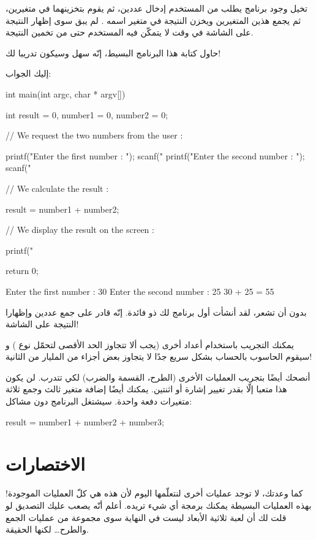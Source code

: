 تخيل وجود برنامج يطلب من المستخدم إدخال عددين، ثم يقوم بتخزينهما في متغيرين، ثم يجمع هذين المتغيرين ويخزن النتيجة في متغير اسمه
.
لم يبق سوى إظهار النتيجة على الشاشة في وقت لا يتمكّن فيه المستخدم حتى من تخمين النتيجة.

حاول كتابة هذا البرنامج البسيط، إنّه سهل وسيكون تدريبا لك!

إليك الجواب:

\begin{Csource}
int main(int argc, char * argv[])
{
  int result = 0, number1 = 0, number2 = 0;

  // We request the two numbers from the user :

  printf("Enter the first number : ");
  scanf("%
  printf("Enter the second number : ");
  scanf("%

  // We calculate the result :

  result = number1 + number2;

  // We display the result on the screen :

  printf("%

  return 0;
}
\end{Csource}

\begin{Console}
  Enter the first number : 30
  Enter the second number : 25
  30 + 25 = 55
\end{Console}

بدون أن تشعر، لقد أنشأت أول برنامج لك ذو فائدة. إنّه قادر على جمع عددين وإظهارا النتيجة على الشاشة!

يمكنك التجريب باستخدام أعداد أخرى (يجب ألا تتجاوز الحد الأقصى لتحمّل نوع )
و سيقوم الحاسوب بالحساب بشكل سريع جدًا لا يتجاوز بعض أجزاء من المليار من الثانية!

أنصحك أيضًا بتجريب العمليات الأخرى (الطرح، القسمة والضرب) لكي تتدرب. لن يكون هذا متعبا إلّا بقدر تغيير إشارة أو اثنتين. يمكنك أيضًا إضافة متغير ثالث وجمع ثلاثة متغيرات دفعة واحدة. سيشتغل البرنامج دون مشاكل:

\begin{Csource}
result = number1 + number2 + number3;
\end{Csource}

\section{الاختصارات}

كما وعدتك، لا توجد عمليات أخرى لنتعلّمها اليوم لأن هذه هي كلّ العمليات الموجودة! بهذه العمليات البسيطة يمكنك برمجة أي شيء تريده. أعلم أنّه يصعب عليك التصديق لو قلت لك أن لعبة ثلاثية الأبعاد ليست في النهاية سوى مجموعة من عمليات الجمع والطرح\dots
لكنها الحقيقة.

